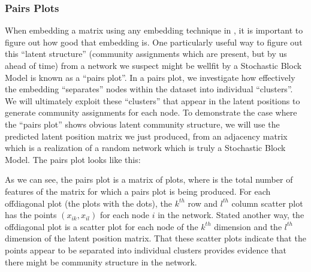 \documentclass[letterpaper,10pt,english]{jupyterBook}
\begin{document}
\subsubsection{Pairs Plots}
\label{\detokenize{representations/ch6/estimating-parameters_spectral:pairs-plots}}
\sphinxAtStartPar
When embedding a matrix using any embedding technique in , it is important to figure out how good that embedding is. One particularly useful way to figure out this “latent structure” (community assignments which are present, but  by us ahead of time) from a network we suspect might be well\sphinxhyphen{}fit by a Stochastic Block Model is known as a “pairs plot”. In a pairs plot, we investigate how effectively the embedding “separates” nodes within the dataset into individual “clusters”. We will ultimately exploit these “clusters” that appear in the latent positions to generate community assignments for each node. To demonstrate the case where the “pairs plot” shows obvious latent community structure, we will use the predicted latent position matrix we just produced, from an adjacency matrix which is a realization of a random network which is truly a Stochastic Block Model. The pairs plot looks like this:

\begin{sphinxVerbatim}[commandchars=\\\{\}]
   

   
\end{sphinxVerbatim}

\noindent{}

\sphinxAtStartPar
As we can see, the pairs plot is a  matrix of plots, where  is the total number of features of the matrix for which a pairs plot is being produced. For each off\sphinxhyphen{}diagonal plot (the plots with the dots), the \(k^{th}\) row and \(l^{th}\) column scatter plot has the points \((x_{ik}, x_{il})\) for each node \(i\) in the network. Stated another way, the off\sphinxhyphen{}diagonal plot is a scatter plot for each node of the \(k^{th}\) dimension and the \(l^{th}\) dimension of the latent position matrix. That these scatter plots indicate that the points appear to be separated into individual clusters provides evidence that there might be community structure in the network.
\end{document}
